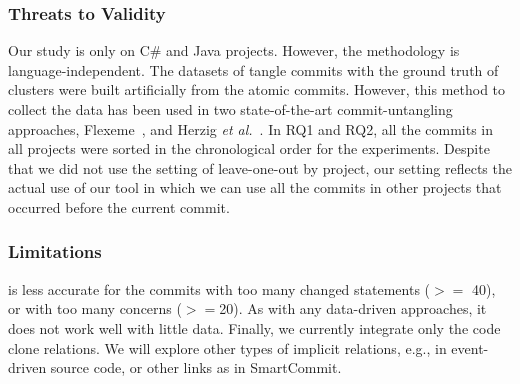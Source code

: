 \subsubsection{{\bf Threats to Validity}}
\label{threats:sec}


Our study is only on C\# and Java projects. However, the methodology
is language-independent. The datasets of tangle commits with the
ground truth of clusters were built artificially from the atomic
commits. However, this method to collect the data has been used in two
state-of-the-art commit-untangling approaches,
Flexeme~\cite{flexeme-fse20}, and Herzig {\em et
  al.}~\cite{kim-msr13}. In RQ1 and RQ2, all the commits in all
projects were sorted in the chronological order for the
experiments. Despite that we did not use the setting of leave-one-out
by project, our setting reflects the actual use of our tool in which
we can use all the commits in other projects that occurred before the
current commit.

\subsubsection{{\bf Limitations}}
{\tool} is less accurate for the commits with too many changed
statements ($>=$ 40), or with too many concerns ($>=$20). As with any
data-driven approaches, it does not work well with little
data. Finally, we currently integrate only the code clone
relations. We will explore other types of implicit relations, e.g., in
event-driven source code, or other links as in SmartCommit.

